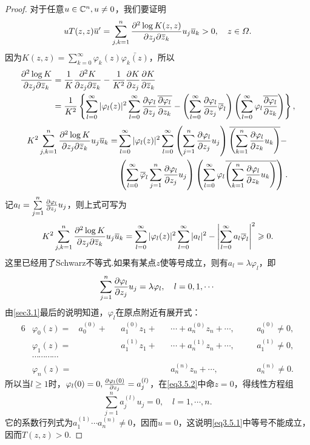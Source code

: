 \begin{proof}
	对于任意$u\in\mathbb C^n,u\neq0$，我们要证明
	\[uT(z,z){}\mkern1mu\overline{\mkern-1muu}'=\sum_{j,k=1}^{n}\frac{\partial^2 \log K(z,z)}{\partial z_j\partial {}\mkern1mu\overline{\mkern-1muz}_k}u_j{}\mkern1mu\overline{\mkern-1muu}_k>0,\quad z\in\varOmega.\]
	因为$K(z,z)=\sum\limits_{k=0}^\infty \varphi_k(z)\bar{\varphi_k(z)}$，所以
	\begin{align*}
		\frac{\partial^2 \log K}{\partial z_j\partial {}\mkern1mu\overline{\mkern-1muz}_k}
		&=\frac1K \frac{\partial^2 K}{\partial z_j\partial {}\mkern1mu\overline{\mkern-1muz}_k}-\frac1{K^2} \frac{\partial K}{\partial z_j}\frac{\partial K}{\partial {}\mkern1mu\overline{\mkern-1muz}_k}\\
		&=\frac1{K^2}\left\{\sum_{l=0}^{\infty}|\varphi_l(z)|^2\sum_{l=0}^{\infty}\frac{\partial \varphi_l}{\partial z_j}{}\mkern1mu\overline{\mkern-1mu\frac{\partial \varphi_l}{\partial z_k}}-\left(\sum_{l=0}^{\infty}\frac{\partial \varphi_l}{\partial z_j}{}\mkern1mu\overline{\mkern-1mu\varphi}_l\right)\left(\sum_{l=0}^{\infty}\varphi_l{}\mkern1mu\overline{\mkern-1mu\frac{\partial \varphi_l}{\partial z_k}}\right)\right\},
	\end{align*}
\begin{align*}
	K^2\sum_{j,k=1}^{n}\frac{\partial^2 \log K}{\partial z_j\partial {}\mkern1mu\overline{\mkern-1muz}_k}u_j{}\mkern1mu\overline{\mkern-1muu}_k
	=&\sum_{l=0}^{\infty}|\varphi_l(z)|^2\sum_{l=0}^{\infty}\left(\sum_{j=1}^{n}\frac{\partial \varphi_l}{\partial z_j}u_j\right){}\mkern1mu\overline{\mkern-1mu\left(\sum_{k=1}^{n}\frac{\partial \varphi_l}{\partial z_k}u_k\right)}-\\
	&\left(\sum_{l=0}^{\infty}{}\mkern1mu\overline{\mkern-1mu\varphi}_l\sum_{j=1}^{n}\frac{\partial \varphi_l}{\partial z_j}u_j\right)\left(\sum_{l=0}^{\infty}\varphi_l {}\mkern1mu\overline{\mkern-1mu\left(\sum_{k=1}^{n}\frac{\partial \varphi_l}{\partial z_k}u_k\right)}\right).
\end{align*}
记$a_l=\sum\limits_{j=1}^{n}\frac{\partial \varphi_l}{\partial z_j}u_j$，则上式可写为
	\begin{equation}\label{eq3.5.1}
		K^2\sum_{j,k=1}^{n}\frac{\partial^2 \log K}{\partial z_j\partial {}\mkern1mu\overline{\mkern-1muz}_k}u_j{}\mkern1mu\overline{\mkern-1muu}_k=\sum_{l=0}^{\infty}|\varphi_l(z)|^2\sum_{l=0}^{\infty}|a_l|^2-\left|\sum_{l=0}^{\infty}a_l{}\mkern1mu\overline{\mkern-1mu\varphi}_l\right|^2\geqslant0.
	\end{equation}
这里已经用了Schwarz不等式.如果有某点$z$使等号成立，则有$a_l=\lambda\varphi_l$，即
	\begin{equation}\label{eq3.5.2}
		\sum_{j=1}^{n}\frac{\partial \varphi_l}{\partial z_j}u_j=\lambda\varphi_l,\quad l=0,1,\cdots
	\end{equation}
由\ref{sec3.1}最后的说明知道，$\varphi_l$在原点附近有展开式：
\begin{alignat*}{6}
	&\varphi_0(z)
	=&a_0^{(0)}+&&a_1^{(0)}z_1+&&\cdots+a_n^{(0)}z_n+\cdots,\quad &&a_0^{(0)}\neq0,\\
	&\varphi_1(z)
	=&  &&a_1^{(1)}z_1+&&\cdots+a_n^{(1)}z_n+\cdots,\quad &&a_1^{(1)}\neq0,\\
	&\cdots\cdots\cdots\cdots  & && &&  &&\\
	&\varphi_n(z)
	=& && &&a_n^{(n)}z_n+\cdots,\quad &&a_n^{(n)}\neq0.
\end{alignat*}
所以当$l\ge1$时，$\varphi_l(0)=0,\frac{\partial \varphi_l(0)}{\partial z_j}=a_j^{(l)}$，在\eqref{eq3.5.2}中命$z=0$，得线性方程组
\[\sum_{j=1}^{n}a_j^{(l)}u_j=0,\quad l=1,\cdots,n.\]
它的系数行列式为$a_1^{(1)}\cdots a_n^{(n)}\neq0$，因而$u=0$，这说明\eqref{eq3.5.1}中等号不能成立，因而$T(z,z)>0$.
\end{proof}
